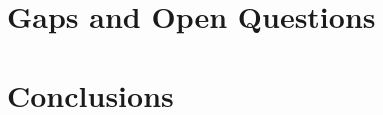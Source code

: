 \documentclass[11pt]{article}
\begin{document}
%
%


\section{Gaps and Open Questions}

%
%
%
%
%
%
%
%
%


\section{Conclusions}

%
%
%
%
%
%



\newpage


\end{document}
